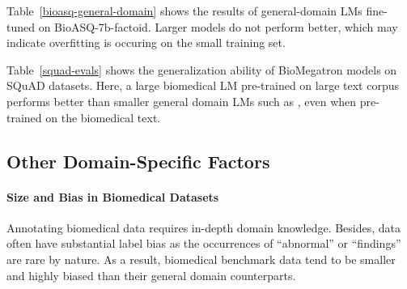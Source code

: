\documentclass[11pt,a4paper]{article}
\begin{document}
Table~\ref{bioasq-general-domain} shows the results of general-domain LMs fine-tuned on BioASQ-7b-factoid.
Larger models do not perform better, which may indicate overfitting is occuring on the small training set.

Table~\ref{squad-evals} shows the generalization ability of BioMegatron models on SQuAD datasets.
Here, a large biomedical LM pre-trained on large text corpus performs better than smaller general domain LMs such as , even when pre-trained on the biomedical text.


\subsection{Other Domain-Specific Factors}

\paragraph{Size and Bias in Biomedical Datasets}

Annotating biomedical data requires in-depth domain knowledge.
Besides, data often have substantial label bias as the occurrences of ``abnormal'' or ``findings'' are rare by nature.
As a result, biomedical benchmark data tend to be smaller and highly biased than their general domain counterparts.

\begin{table}[h]
\centering
{}
\caption{\label{bio-dataset}Label bias in general and biomedical benchmark dataset. CONLL-2003~\citep{sang2003introduction}, MRPC~\citep{dolan2005microsoft}, and SQuAD~\citep{rajpurkar2016squad} are general domain dataset for NER, CLS (RE), and QA, respectively, for comparison against biomedical domain dataset. Label bias is computed as [\textit{sum of the \#samples of minority labels}]/[\textit{\#samples of majority label}], for NER and RE (CLS), and [\textit{\#minimum repeat of the same answer}]/[\textit{\#maximum repeat of the same answer}] for QA.}
\end{table}
\end{document}

